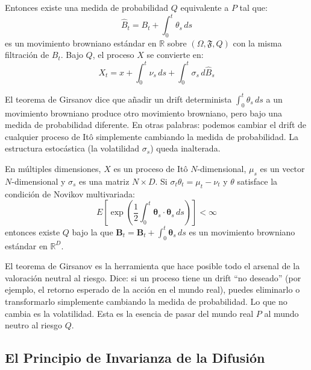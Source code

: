 \documentclass[12pt]{article}
\begin{document}
Entonces existe una medida de probabilidad $Q$ equivalente a $P$ tal que:
\begin{equation}
  \hat{B}_t = B_t + \int_0^t \theta_s \, ds
\end{equation}
es un movimiento browniano est\'andar en $\mathbb{R}$ sobre $(\Omega, \mathfrak{F}, Q)$ con la misma filtraci\'on de $B_t$. Bajo $Q$, el proceso $X$ se convierte en:
\begin{equation}
  X_t = x + \int_0^t \nu_s \, ds + \int_0^t \sigma_s \, d\hat{B}_s
\end{equation}

\begin{intuicionmat}
El teorema de Girsanov dice que a\~nadir un drift determinista $\int_0^t \theta_s\,ds$ a un movimiento browniano produce otro movimiento browniano, pero bajo una medida de probabilidad diferente. En otras palabras: podemos cambiar el drift de cualquier proceso de It\^o simplemente cambiando la medida de probabilidad. La estructura estoc\'astica (la volatilidad $\sigma_s$) queda inalterada.
\end{intuicionmat}

En m\'ultiples dimensiones, $X$ es un proceso de It\^o $N$-dimensional, $\mu_s$ es un vector $N$-dimensional y $\sigma_s$ es una matriz $N \times D$. Si $\sigma_t \theta_t = \mu_t - \nu_t$ y $\theta$ satisface la condici\'on de Novikov multivariada:
\begin{equation}
  E\!\left[\exp\!\left(\frac{1}{2}\int_0^t \boldsymbol{\theta}_s \cdot \boldsymbol{\theta}_s \, ds\right)\right] < \infty
\end{equation}
entonces existe $Q$ bajo la que $\hat{\mathbf{B}}_t = \mathbf{B}_t + \int_0^t \boldsymbol{\theta}_s \, ds$ es un movimiento browniano est\'andar en $\mathbb{R}^D$.

\begin{intuicion}
El teorema de Girsanov es la herramienta que hace posible todo el arsenal de la valoraci\'on neutral al riesgo. Dice: si un proceso tiene un drift ``no deseado'' (por ejemplo, el retorno esperado de la acci\'on en el mundo real), puedes eliminarlo o transformarlo simplemente cambiando la medida de probabilidad. Lo que no cambia es la volatilidad. Esta es la esencia de pasar del mundo real $P$ al mundo neutro al riesgo $Q$.
\end{intuicion}

\subsection{El Principio de Invarianza de la Difusi\'on}
\end{document}
